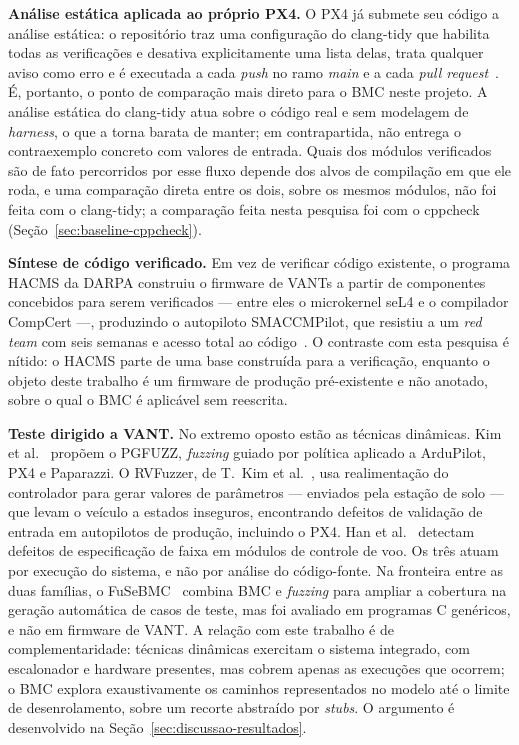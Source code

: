 \textbf{Análise estática aplicada ao próprio PX4.} O PX4 já submete seu código a análise
estática: o repositório traz uma configuração do clang-tidy que habilita todas as
verificações e desativa explicitamente uma lista delas, trata qualquer aviso como erro
e é executada a cada \textit{push} no ramo \textit{main} e a cada \textit{pull
request}~\cite{PX4_ClangTidy}. É, portanto, o ponto de comparação mais direto para o BMC
neste projeto. A análise estática do clang-tidy atua sobre o código real e sem
modelagem de \textit{harness}, o que a torna barata de manter; em contrapartida, não
entrega o contraexemplo concreto com valores de entrada. Quais dos módulos
verificados são de fato percorridos por esse fluxo depende dos alvos de compilação em
que ele roda, e uma comparação direta entre os dois, sobre os mesmos módulos, não foi
feita com o clang-tidy; a comparação feita nesta pesquisa foi com o cppcheck (Seção~\ref{sec:baseline-cppcheck}).

\textbf{Síntese de código verificado.} Em vez de verificar código existente, o
programa HACMS da DARPA construiu o firmware de VANTs a partir de componentes
concebidos para serem verificados --- entre eles o microkernel seL4 e o
compilador CompCert ---, produzindo o autopiloto SMACCMPilot, que resistiu a um
\textit{red team} com seis semanas e acesso total ao código~\cite{Fisher2017}. O
contraste com esta pesquisa é nítido: o HACMS parte de uma base construída para a
verificação, enquanto o objeto deste trabalho é um firmware de produção
pré-existente e não anotado, sobre o qual o BMC é aplicável sem reescrita.

\textbf{Teste dirigido a VANT.} No extremo oposto estão as técnicas dinâmicas.
Kim et al.~\cite{Kim2021PGFuzz} propõem o PGFUZZ, \textit{fuzzing} guiado por
política aplicado a ArduPilot, PX4 e Paparazzi. O RVFuzzer, de T.~Kim et
al.~\cite{Kim2019RVFuzzer}, usa realimentação do controlador para gerar valores
de parâmetros --- enviados pela estação de solo --- que levam o veículo a estados
inseguros, encontrando defeitos de validação de entrada em autopilotos de
produção, incluindo o PX4. Han et al.~\cite{Han2024RangeFuzz} detectam defeitos de
especificação de faixa em módulos de controle de voo. Os três atuam por execução do sistema, e não por análise do código-fonte. Na fronteira
entre as duas famílias, o FuSeBMC~\cite{Alshmrany2022} combina BMC e \textit{fuzzing} para
ampliar a cobertura na geração automática de casos de teste, mas foi avaliado em
programas C genéricos, e não em firmware de VANT. A relação com este trabalho é de
complementaridade: técnicas dinâmicas exercitam o sistema integrado, com
escalonador e hardware presentes, mas cobrem apenas as execuções que ocorrem; o
BMC explora exaustivamente os caminhos representados no modelo até o limite de
desenrolamento, sobre um recorte abstraído por \textit{stubs}. O argumento é desenvolvido na
Seção~\ref{sec:discussao-resultados}.

